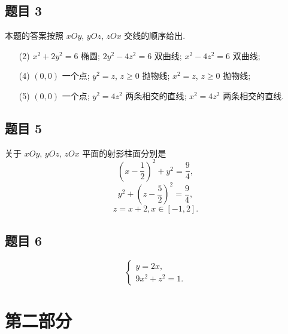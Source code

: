\subsection*{ 题目 3 }
\begin{solution}
    本题的答案按照 $xOy$, $yOz$, $zOx$ 交线的顺序给出.
\begin{enumerate}
    \item[(2)] $x^2 + 2y^2 = 6$ 椭圆; $2y^2 - 4z^2 = 6$ 双曲线; $x^2 - 4z^2 = 6$ 双曲线;
    \item[(4)] $(0, 0)$ 一个点; $y^2 = z$, $z \geqslant 0$ 抛物线; $x^2 = z$, $z \geqslant 0$ 抛物线; 
    \item[(5)] $(0, 0)$ 一个点; $y^2 = 4z^2$ 两条相交的直线; $x^2 = 4z^2$ 两条相交的直线.
\end{enumerate}
\end{solution}

\subsection*{ 题目 5 }
\begin{solution}
关于 $xOy$, $yOz$, $zOx$ 平面的射影柱面分别是
\[
(x - \frac{1}{2})^2 + y^2 = \frac{9}{4},
\]
\[
y^2 + (z - \frac{5}{2})^2 = \frac{9}{4},
\]
\[
z = x + 2, x \in [-1, 2].
\]
\end{solution}

\subsection*{ 题目 6 }
\begin{solution}
\[
\begin{cases}
    y = 2x, \\
    9x^2 + z^2 = 1.
\end{cases}
\]
\end{solution}

\section{第二部分}
